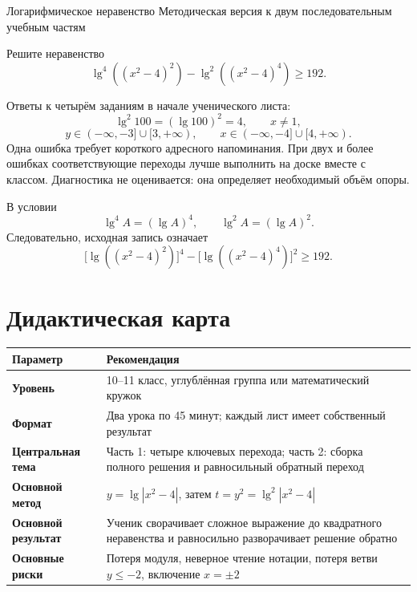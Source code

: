 \worksheettitle
  {Логарифмическое неравенство}
  {Методическая версия к двум последовательным учебным частям}

\begin{problembox}
  Решите неравенство
  \[
    \lg^4((x^2-4)^2)-\lg^2((x^2-4)^4)\ge192.
  \]
\end{problembox}

\begin{teacherbox}
  Ответы к четырём заданиям в начале ученического листа:
  \[
    \lg^2 100=(\lg100)^2=4,
    \qquad x\ne1,
  \]
  \[
    y\in(-\infty,-3]\cup[3,+\infty),
    \qquad
    x\in(-\infty,-4]\cup[4,+\infty).
  \]
  Одна ошибка требует короткого адресного напоминания. При двух и более
  ошибках соответствующие переходы лучше выполнить на доске вместе с классом.
  Диагностика не оценивается: она определяет необходимый объём опоры.
\end{teacherbox}

\begin{notebox}
  В условии
  \[
    \lg^4 A=(\lg A)^4,
    \qquad
    \lg^2 A=(\lg A)^2.
  \]
  Следовательно, исходная запись означает
  \[
    \bigl[\lg((x^2-4)^2)\bigr]^4
    -\bigl[\lg((x^2-4)^4)\bigr]^2\ge192.
  \]
\end{notebox}

\section{Дидактическая карта}

\begin{center}
  \renewcommand{\arraystretch}{1.5}
  \begin{tabularx}{\textwidth}{@{}
    >{\bfseries\sffamily}p{}X@{}}
    \toprule
    \rowcolor{TableHeader}
    Параметр & Рекомендация \\
    \midrule
    Уровень & 10--11 класс, углублённая группа или математический кружок \\
    Формат & Два урока по 45 минут; каждый лист имеет собственный результат \\
    Центральная тема & Часть 1: четыре ключевых перехода; часть 2: сборка полного решения и равносильный обратный переход \\
    Основной метод & \(y=\lg|x^2-4|\), затем \(t=y^2=\lg^2|x^2-4|\) \\
    Основной результат & Ученик сворачивает сложное выражение до квадратного неравенства и равносильно разворачивает решение обратно \\
    Основные риски & Потеря модуля, неверное чтение нотации, потеря ветви \(y\le-2\), включение \(x=\pm2\) \\
    \bottomrule
  \end{tabularx}
\end{center}

